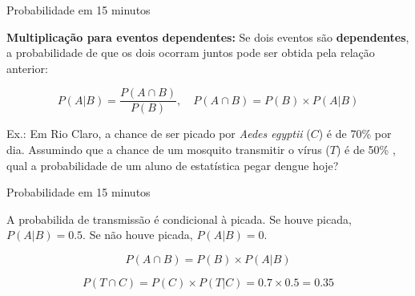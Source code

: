 \documentclass{beamer}\usepackage[]{graphicx}\usepackage[]{color}
\begin{document}
\begin{frame}{Probabilidade em 15 minutos}

\textbf{Multiplicação para eventos dependentes:} Se dois eventos são \textbf{dependentes}, a probabilidade de que os dois ocorram juntos pode ser obtida pela relação anterior: 

\begin{equation*}
    P(A|B) = \frac{P(A \cap B)}{P(B)},  \quad P(A \cap B) = P(B) \times P(A|B)
\end{equation*}

\alert{Ex.:} Em Rio Claro, a chance de ser picado por \emph{Aedes egyptii} ($C$) é de 70\% por dia. Assumindo que a chance de um mosquito transmitir o vírus ($T$) é de 50\% , qual a probabilidade de um aluno de estatística pegar dengue hoje?



\end{frame} 


\begin{frame}{Probabilidade em 15 minutos}

A probabilida de transmissão é condicional à picada. Se houve picada, $P(A | B) = 0.5$. Se não houve picada, $P(A | B) = 0$.

 
 \begin{equation*}
     P(A \cap B) = P(B) \times P(A | B) 
 \end{equation*}
 
  \begin{equation*}
     P(T \cap C) = P(C) \times P(T | C) = 0.7 \times 0.5 = 0.35
 \end{equation*}
 

\end{frame} 
\end{document}

